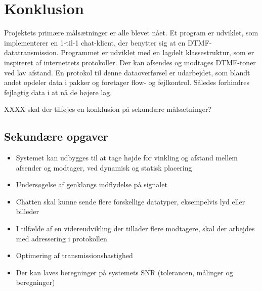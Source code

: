 \section{Konklusion}
Projektets primære målsætninger er alle blevet nået. Et program er udviklet, som implementerer en 1-til-1 chat-klient, der benytter sig at en DTMF-datatransmission. Programmet er udviklet med en lagdelt klassestruktur, som er inspireret af internettets protokoller. Der kan afsendes og modtages DTMF-toner ved lav afstand. En protokol til denne dataoverførsel er udarbejdet, som blandt andet opdeler data i pakker og foretager flow- og fejlkontrol. Således forhindres fejlagtig data i at nå de højere lag.


XXXX skal der tilføjes en konklusion på sekundære målsætninger?
\subsection{Sekundære opgaver}
\begin{itemize}[noitemsep]
\item Systemet kan udbygges til at tage højde for vinkling og afstand mellem afsender og modtager, ved dynamisk og statisk placering
\item Undersøgelse af genklangs indflydelse på signalet
\item Chatten skal kunne sende flere forskellige datatyper, eksempelvis lyd eller billeder
\item I tilfælde af en videreudvikling der tillader flere modtagere, skal der arbejdes med adressering i protokollen
\item Optimering af transmissionshastighed
\item Der kan laves beregninger på systemets SNR (tolerancen, målinger og beregninger)
\end{itemize}